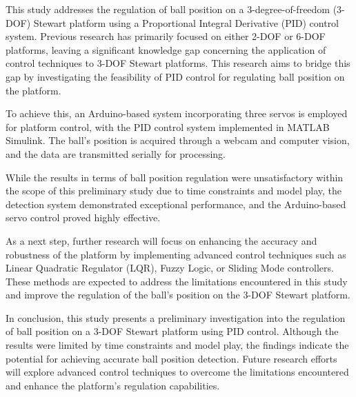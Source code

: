 This study addresses the regulation of ball position on a 3-degree-of-freedom (3-DOF) Stewart platform using a Proportional Integral Derivative (PID) control system. Previous research has primarily focused on either 2-DOF or 6-DOF platforms, leaving a significant knowledge gap concerning the application of control techniques to 3-DOF Stewart platforms. This research aims to bridge this gap by investigating the feasibility of PID control for regulating ball position on the platform.

To achieve this, an Arduino-based system incorporating three servos is employed for platform control, with the PID control system implemented in MATLAB Simulink. The ball's position is acquired through a webcam and computer vision, and the data are transmitted serially for processing.

While the results in terms of ball position regulation were unsatisfactory within the scope of this preliminary study due to time constraints and model play, the detection system demonstrated exceptional performance, and the Arduino-based servo control proved highly effective.

As a next step, further research will focus on enhancing the accuracy and robustness of the platform by implementing advanced control techniques such as Linear Quadratic Regulator (LQR), Fuzzy Logic, or Sliding Mode controllers. These methods are expected to address the limitations encountered in this study and improve the regulation of the ball's position on the 3-DOF Stewart platform.

In conclusion, this study presents a preliminary investigation into the regulation of ball position on a 3-DOF Stewart platform using PID control. Although the results were limited by time constraints and model play, the findings indicate the potential for achieving accurate ball position detection. Future research efforts will explore advanced control techniques to overcome the limitations encountered and enhance the platform's regulation capabilities.